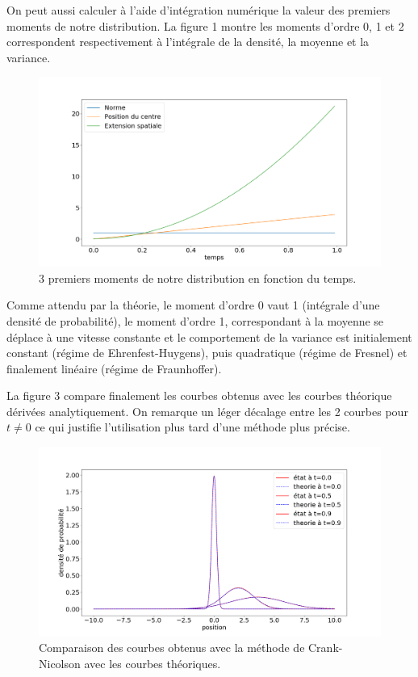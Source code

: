 \documentclass[11pt, a4paper, twocolumn]{article}
\begin{document}
On peut aussi calculer à l'aide d'intégration numérique la valeur des premiers moments de notre distribution. La figure 1 montre les moments d'ordre 0, 1 et 2 correspondent respectivement à l'intégrale de la densité, la moyenne et la variance.
\begin{figure}
\includegraphics[width=\linewidth]{Figure_2.png}
\caption{3 premiers moments de notre distribution en fonction du temps.}
\end{figure}

Comme attendu par la théorie, le moment d'ordre 0 vaut 1 (intégrale d'une densité de probabilité), le moment d'ordre 1, correspondant à la moyenne se déplace à une vitesse constante et le comportement de la variance est initialement constant (régime de Ehrenfest-Huygens), puis quadratique (régime de Fresnel) et finalement linéaire (régime de Fraunhoffer).

La figure 3 compare finalement les courbes obtenus avec les courbes théorique dérivées analytiquement. On remarque un léger décalage entre les 2 courbes pour $t\neq0$ ce qui justifie l'utilisation plus tard d'une méthode plus précise.
\begin{figure}
\includegraphics[width=\linewidth]{Figure_3.png}
\caption{Comparaison des courbes obtenus avec la méthode de Crank-Nicolson avec les courbes théoriques.}
\end{figure}
\end{document}
